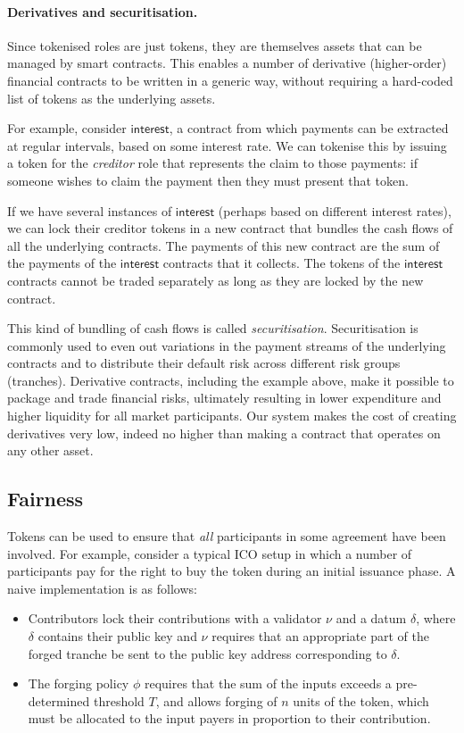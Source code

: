 \paragraph{Derivatives and securitisation.}
%
Since tokenised roles are just tokens, they are themselves assets that can be managed by smart contracts.
This enables a number of derivative (higher-order) financial contracts to be written in a generic way, without requiring a hard-coded list of tokens as the underlying assets.

For example, consider $\mathsf{interest}$, a contract from which payments can be extracted at regular intervals, based on some interest rate.
We can tokenise this by issuing a token for the \emph{creditor} role that represents the claim to those payments: if someone wishes to claim the payment then they must present that token.

If we have several instances of $\mathsf{interest}$ (perhaps based on different interest rates), we can lock their creditor tokens in a new contract that bundles the cash flows of all the underlying contracts.
The payments of this new contract are the sum of the payments of the $\mathsf{interest}$ contracts that it collects.
The tokens of the $\mathsf{interest}$ contracts cannot be traded separately as long as they are locked by the new contract.

This kind of bundling of cash flows is called \emph{securitisation}.
Securitisation is commonly used to even out variations in the payment streams of the underlying contracts and to distribute their default risk across different risk groups (tranches).
Derivative contracts, including the example above, make it possible to package and trade financial risks, ultimately resulting in lower expenditure and higher liquidity for all market participants.
Our system makes the cost of creating derivatives very low, indeed no higher than making a contract that operates on any other asset.

\subsection{Fairness}

Tokens can be used to ensure that \emph{all} participants in some agreement have been involved. For example, consider a typical ICO setup in which a number of participants pay for the right to buy the token during an initial issuance phase.
A naive implementation is as follows:
%
\begin{itemize}
\item
  Contributors lock their contributions with a validator $\nu$ and a datum $\delta$, where $\delta$ contains their public key and $\nu$ requires that an appropriate part of the forged tranche be sent to the public key address corresponding to $\delta$.
\item
  The forging policy $\phi$ requires that the sum of the inputs exceeds a pre-determined  threshold $T$, and allows forging of $n$ units of the token, which must be allocated to the input payers in proportion to their contribution.
\end{itemize}

